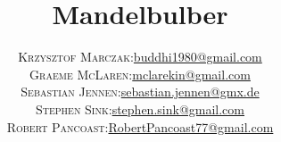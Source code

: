 % 
%





\newcommand{\mTitle}{Mandelbulber}
\newcommand{\mSubtitle}{End User Manual}
\newcommand{\mVersionDocument}{2.32.0.0}
\newcommand{\mDateDocument}{2020-October}
\newcommand{\mAuthor}{	
\begin{tabular}{r|p{11cm}}
	\textsc{Krzysztof Marczak:}
		& \href{mailto:buddhi1980@gmail.com}
		{buddhi1980@gmail.com} \\
	\textsc{Graeme McLaren:}
		& \href{mailto:mclarekin@gmail.com}
		{mclarekin@gmail.com} \\
	\textsc{Sebastian Jennen:}
		& \href{mailto:sebastian.jennen@gmx.de}
		{sebastian.jennen@gmx.de} \\
	\textsc{Stephen Sink:}
		& \href{mailto:stephen.sink@gmail.com}
		{stephen.sink@gmail.com} \\
	\textsc{Robert Pancoast:}
		& \href{mailto:RobertPancoast77@gmail.com}
		{RobertPancoast77@gmail.com}
\end{tabular}}


\title{\mTitle}
\author{\mAuthor}




